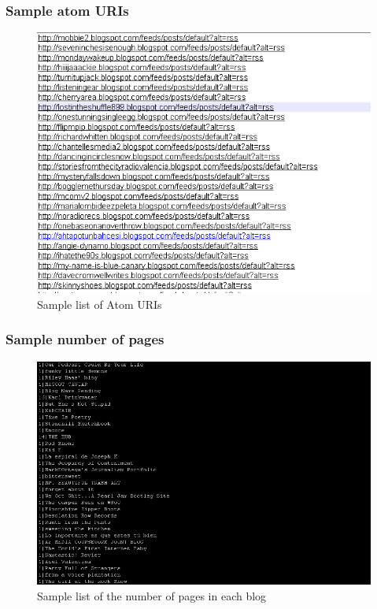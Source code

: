 \subsubsection{Sample atom URIs}
\begin{figure}[ht]    
    \begin{center}
        \includegraphics[scale=1.1]{sampleatomurls.png}
        \caption{Sample list of Atom URIs}
        \label{Samplelist2}
    \end{center}
\end{figure}
\newpage

\subsubsection{Sample number of pages}
\begin{figure}[ht]    
    \begin{center}
        \includegraphics[scale=1.1]{samplenoofpages.png}
        \caption{Sample list of the number of pages in each blog}
        \label{Samplelist3}
    \end{center}
\end{figure}
\newpage

